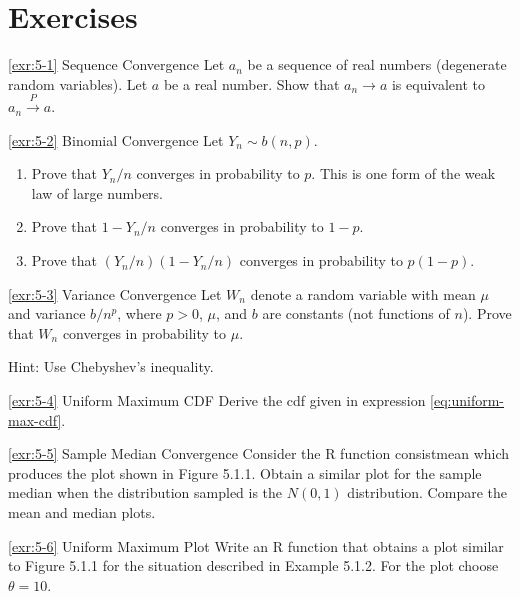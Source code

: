 \section*{Exercises}\label{sec:chapter5-exercises}

\begin{exercise}{\ref{exr:5-1} Sequence Convergence}\label{exr:5-1}
Let ${a_n}$ be a sequence of real numbers (degenerate random variables). Let $a$ be a real number. Show that $a_n \to a$ is equivalent to $a_n \xrightarrow{P} a$.
\end{exercise}

\begin{exercise}{\ref{exr:5-2} Binomial Convergence}\label{exr:5-2}
Let $Y_n \sim b(n,p)$.
\begin{enumerate}
\item[(a)] Prove that $Y_n/n$ converges in probability to $p$. This is one form of the weak law of large numbers.
\item[(b)] Prove that $1 - Y_n/n$ converges in probability to $1 - p$.
\item[(c)] Prove that $(Y_n/n)(1 - Y_n/n)$ converges in probability to $p(1-p)$.
\end{enumerate}
\end{exercise}

\begin{exercise}{\ref{exr:5-3} Variance Convergence}\label{exr:5-3}
Let $W_n$ denote a random variable with mean $\mu$ and variance $b/n^p$, where $p > 0$, $\mu$, and $b$ are constants (not functions of $n$). Prove that $W_n$ converges in probability to $\mu$.

Hint: Use Chebyshev's inequality.
\end{exercise}

\begin{exercise}{\ref{exr:5-4} Uniform Maximum CDF}\label{exr:5-4}
Derive the cdf given in expression \eqref{eq:uniform-max-cdf}.
\end{exercise}

\begin{exercise}{\ref{exr:5-5} Sample Median Convergence}\label{exr:5-5}
Consider the R function consistmean which produces the plot shown in Figure 5.1.1. Obtain a similar plot for the sample median when the distribution sampled is the $N(0,1)$ distribution. Compare the mean and median plots.
\end{exercise}

\begin{exercise}{\ref{exr:5-6} Uniform Maximum Plot}\label{exr:5-6}
Write an R function that obtains a plot similar to Figure 5.1.1 for the situation described in Example 5.1.2. For the plot choose $\theta = 10$.
\end{exercise}

